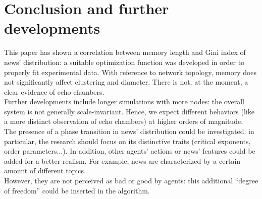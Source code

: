 \section{Conclusion and further developments}
This paper has shown a correlation between memory length and Gini
index of news' distribution: a suitable optimization function
was developed in order to properly fit experimental data.
With reference to network topology, memory does not significantly
affect clustering and diameter.
There is not, at the moment, a clear evidence of echo chambers.\\
Further developments include longer simulations with more nodes:
the overall system is not generally scale-invariant.
Hence, we expect different behaviors (like a more distinct observation
of echo chambers) at higher orders of magnitude.\\
The presence of a phase transition in news' distribution could be
investigated: in particular, the research should focus on its
distinctive traits (critical exponents, order parameters...).
In addition, other agents' actions or news' features could be added
for a better realism.
For example, news are characterized by a certain amount of
different topics.\\
However, they are not perceived as bad or good by agents:
this additional ``degree of freedom'' could be inserted
in the algorithm.
